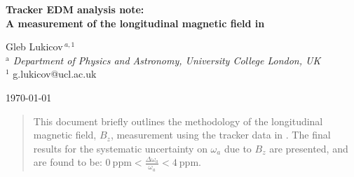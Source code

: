 \documentclass[12pt]{article}
\def\Title#1{\begin{center} {\Large {\bf #1} } \end{center}}
\begin{document}
\Title{Tracker EDM analysis note: \\ A measurement of the longitudinal magnetic field in \R1}

\bigskip\bigskip

\thispagestyle{empty}
\begin{raggedright}  
Gleb Lukicov$\,^{a,1}$\\
{\it $^{\mathrm{a}}$ Department of Physics and Astronomy, University College London, UK} \\
{ $^{1}$ g.lukicov@ucl.ac.uk}
\bigskip\bigskip
\end{raggedright}

\begin{center}
\today
\end{center}

\null\vspace{\fill}
\begin{abstract}
This document briefly outlines the methodology of the longitudinal magnetic field, $B_z$, measurement using the tracker data in . The final results for the systematic uncertainty on $\omega_a$ due to $B_z$ are presented, and are found to be: $0 \ \mathrm{ppm} < \frac{\Delta \omega_a}{\omega_a} < 4  \ \mathrm{ppm} $.
\end{abstract}
\vspace{\fill}

\tableofcontents

\clearpage
\thispagestyle{plain}
\end{document}
